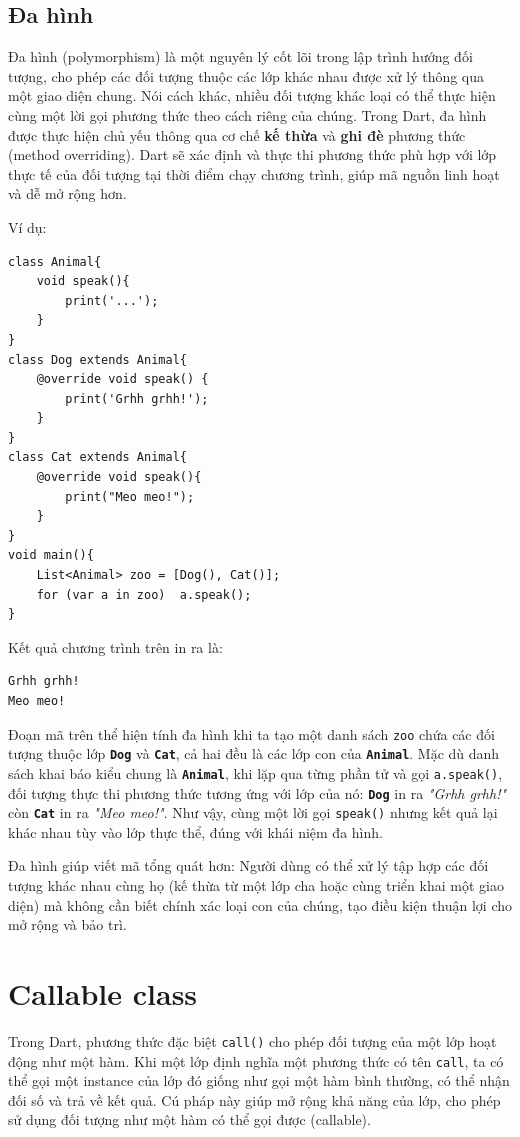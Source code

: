\documentclass[../DoAn.tex]{subfiles}
\numberwithin{figure}{chapter}
\begin{document}
\subsection{Đa hình} 
Đa hình (polymorphism) là một nguyên lý cốt lõi trong lập trình hướng đối tượng, cho phép các đối tượng thuộc các lớp khác nhau được xử lý thông qua một giao diện chung. Nói cách khác, nhiều đối tượng khác loại có thể thực hiện cùng một lời gọi phương thức theo cách riêng của chúng. Trong Dart, đa hình được thực hiện chủ yếu thông qua cơ chế \textbf{kế thừa} và \textbf{ghi đè} phương thức (method overriding). Dart sẽ xác định và thực thi phương thức phù hợp với lớp thực tế của đối tượng tại thời điểm chạy chương trình, giúp mã nguồn linh hoạt và dễ mở rộng hơn.

Ví dụ:
\begin{lstlisting}
class Animal{
    void speak(){
        print('...');
    }
}
class Dog extends Animal{
    @override void speak() { 
        print('Grhh grhh!'); 
    }
}
class Cat extends Animal{
    @override void speak(){
        print("Meo meo!");
    }
}
void main(){
    List<Animal> zoo = [Dog(), Cat()];
    for (var a in zoo)  a.speak(); 
}
\end{lstlisting}

Kết quả chương trình trên in ra là:
\begin{lstlisting}
Grhh grhh!
Meo meo!
\end{lstlisting}

Đoạn mã trên thể hiện tính đa hình khi ta tạo một danh sách \texttt{zoo} chứa các đối tượng thuộc lớp \textbf{\texttt{Dog}} và \textbf{\texttt{Cat}}, cả hai đều là các lớp con của \textbf{\texttt{Animal}}. Mặc dù danh sách khai báo kiểu chung là \textbf{\texttt{Animal}}, khi lặp qua từng phần tử và gọi \texttt{a.speak()}, đối tượng thực thi phương thức tương ứng với lớp của nó: \textbf{\texttt{Dog}} in ra \emph{{}"Grhh grhh!"} còn \textbf{\texttt{Cat}} in ra \emph{{}"Meo meo!"}. Như vậy, cùng một lời gọi \texttt{speak()} nhưng kết quả lại khác nhau tùy vào lớp thực thể, đúng với khái niệm đa hình. 

Đa hình giúp viết mã tổng quát hơn: Người dùng có thể xử lý tập hợp các đối tượng khác nhau cùng họ (kế thừa từ một lớp cha hoặc cùng triển khai một giao diện) mà không cần biết chính xác loại con của chúng, tạo điều kiện thuận lợi cho mở rộng và bảo trì.

\section{Callable class}
Trong Dart, phương thức đặc biệt \verb|call()| cho phép đối tượng của một lớp hoạt động như một hàm. Khi một lớp định nghĩa một phương thức có tên \verb|call|, ta có thể gọi một instance của lớp đó giống như gọi một hàm bình thường, có thể nhận đối số và trả về kết quả. Cú pháp này giúp mở rộng khả năng của lớp, cho phép sử dụng đối tượng như một hàm có thể gọi được (callable). 
\end{document}
